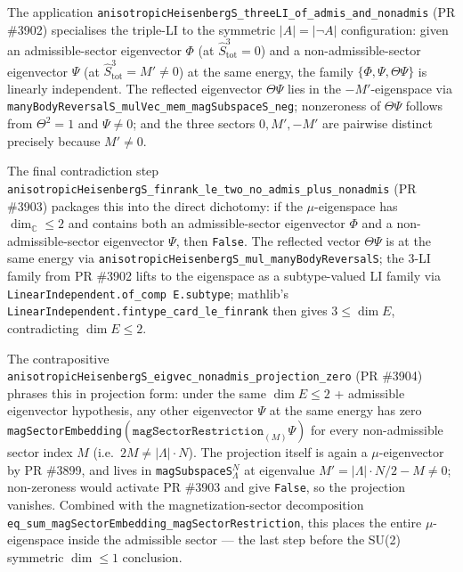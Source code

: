 \documentclass[a4paper,11pt]{article}
\begin{document}
The application
\texttt{anisotropicHeisenbergS\_threeLI\_of\_admis\_and\_nonadmis} (PR \#3902)
specialises the triple-LI to the symmetric \(|A|=|\neg A|\) configuration: given
an admissible-sector eigenvector \(\Phi\) (at \(\hat S^3_{\mathrm{tot}}=0\)) and
a non-admissible-sector eigenvector \(\Psi\) (at \(\hat S^3_{\mathrm{tot}}=M'\ne
0\)) at the same energy, the family \(\{\Phi,\Psi,\Theta\Psi\}\) is linearly
independent.  The reflected eigenvector \(\Theta\Psi\) lies in the
\(-M'\)-eigenspace via
\texttt{manyBodyReversalS\_mulVec\_mem\_magSubspaceS\_neg}; nonzeroness of
\(\Theta\Psi\) follows from \(\Theta^2=1\) and \(\Psi\ne0\); and the three
sectors \(0,M',-M'\) are pairwise distinct precisely because \(M'\ne0\).

The final contradiction step
\texttt{anisotropicHeisenbergS\_finrank\_le\_two\_no\_admis\_plus\_nonadmis} (PR
\#3903) packages this into the direct dichotomy: if the \(\mu\)-eigenspace has
\(\dim_{\mathbb C}\le 2\) and contains both an admissible-sector eigenvector
\(\Phi\) and a non-admissible-sector eigenvector \(\Psi\), then \texttt{False}.
The reflected vector \(\Theta\Psi\) is at the same energy via
\texttt{anisotropicHeisenbergS\_mul\_manyBodyReversalS}; the 3-LI family from
PR \#3902 lifts to the eigenspace as a subtype-valued LI family via
\texttt{LinearIndependent.of\_comp E.subtype}; mathlib's
\texttt{LinearIndependent.fintype\_card\_le\_finrank} then gives \(3\le\dim E\),
contradicting \(\dim E\le 2\).

The contrapositive
\texttt{anisotropicHeisenbergS\_eigvec\_nonadmis\_projection\_zero} (PR \#3904)
phrases this in projection form: under the same \(\dim E\le 2\) + admissible
eigenvector hypothesis, any other eigenvector \(\Psi\) at the same energy has
zero \texttt{magSectorEmbedding}\((\texttt{magSectorRestriction}_{(M)}\Psi)\) for
every non-admissible sector index \(M\) (i.e.\ \(2M\ne|\Lambda|\cdot N\)).  The
projection itself is again a \(\mu\)-eigenvector by PR \#3899, and lives in
\texttt{magSubspaceS}\(_\Lambda^N\) at eigenvalue \(M'=|\Lambda|\cdot N/2 - M\ne0\);
non-zeroness would activate PR \#3903 and give \texttt{False}, so the projection
vanishes.  Combined with the magnetization-sector decomposition
\texttt{eq\_sum\_magSectorEmbedding\_magSectorRestriction}, this places the
entire \(\mu\)-eigenspace inside the admissible sector — the last step before
the SU(2) symmetric \(\dim\le1\) conclusion.
\end{document}
